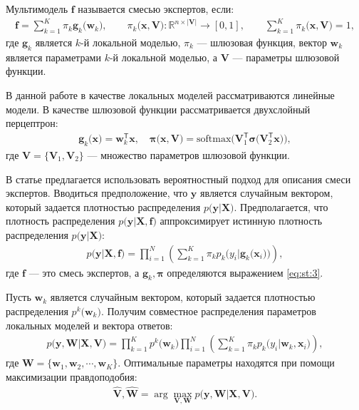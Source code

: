 \begin{definition}
\label{def:2}
Мультимодель $\mathbf{f}$ называется смесью экспертов, если:
\[
\label{eq:st:2}
\begin{aligned}
\mathbf{f} = \sum_{k=1}^{K}\pi_{k}\mathbf{g}_k\bigr(\mathbf{w}_k\bigr), \qquad \pi_{k}\bigr(\mathbf{x}, \mathbf{V}\bigr):\mathbb{R}^{n\times \left|\mathbf{V}\right|} \to [0, 1], \qquad \sum_{k=1}^{K}\pi_{k}\bigr(\mathbf{x}, \mathbf{V}\bigr) = 1,
\end{aligned}
\]
где $\mathbf{g}_k$ является $k$-й локальной моделью, $\pi_k$ --- шлюзовая функция, вектор $\mathbf{w}_k$ является параметрами $k$-й локальной моделью, а $\mathbf{V}$ --- параметры шлюзовой функции.
\end{definition}

В данной работе в качестве локальных моделей рассматриваются линейные модели. В качестве шлюзовой функции рассматривается двухслойный перцептрон:
\[
\label{eq:st:3}
\begin{aligned}
\mathbf{g}_k\bigr(\textbf{x}\bigr) = \textbf{w}_k^{\mathsf{T}}\textbf{x}, \quad
\bm{\pi}\bigr(\mathbf{x}, \mathbf{V}\bigr) = \text{softmax}\bigr(\mathbf{V}_{1}^{\mathsf{T}}\bm{\sigma}\bigr(\mathbf{V}_2^{\mathsf{T}}\mathbf{x}\bigr)\bigr),
\end{aligned}
\]
где $\mathbf{V} = \bigr\{\mathbf{V}_1, \mathbf{V}_2\bigr\}$ --- множество параметров шлюзовой функции.

В статье предлагается использовать вероятностный подход для описания смеси экспертов. Вводиться предположение, что $\textbf{y}$ является случайным вектором, который задается плотностью распределения $p\bigr(\textbf{y}|\textbf{X}\bigr)$. Предполагается, что плотность распределения $p\bigr(\textbf{y}|\textbf{X}, \textbf{f}\bigr)$ аппроксимирует истинную плотность распределения $p\bigr(\textbf{y}|\textbf{X}\bigr)$:
\[
\label{eq:st:new:1}
\begin{aligned}
p\bigr(\textbf{y}|\textbf{X}, \textbf{f}\bigr) = \prod_{i=1}^{N}\left(\sum_{k=1}^{K}\pi_kp_{k}\bigr(y_{i}|\textbf{g}_{k}\bigr(\mathbf{x}_{i}\bigr)\bigr)\right),
\end{aligned}
\]
где $\textbf{f}$ --- это смесь экспертов, а $\textbf{g}_k, \bm{\pi}$ определяются выражением \eqref{eq:st:3}.

Пусть $\textbf{w}_k$ является случайным вектором, который задается плотностью распределения $p^{k}\bigr(\mathbf{w}_k\bigr)$. Получим совместное распределения параметров локальных моделей и вектора ответов:
\[
\label{eq:st:4}
\begin{aligned}
p\bigr(\mathbf{y}, \mathbf{W}|\mathbf{X}, \mathbf{V}\bigr) = \prod_{k=1}^{K}p^{k}\bigr(\mathbf{w}_k\bigr)\prod_{i=1}^{N}\left(\sum_{k=1}^{K}\pi_{k}p_{k}\bigr(y_i|\mathbf{w}_k, \mathbf{x}_i\bigr)\right),
\end{aligned}
\]
где $\mathbf{W} = \bigr\{\mathbf{w}_1, \mathbf{w}_2, \cdots, \mathbf{w}_K\bigr\}.$
Оптимальные параметры находятся при помощи максимизации правдоподобия:
\[
\label{eq:st:5}
\begin{aligned}
\hat{\mathbf{V}}, \hat{ \mathbf{W}} = \arg\max_{\mathbf{V}, \mathbf{W}} p\bigr(\mathbf{y},  \mathbf{W}|\mathbf{X}, \mathbf{V}\bigr).
\end{aligned}
\]


